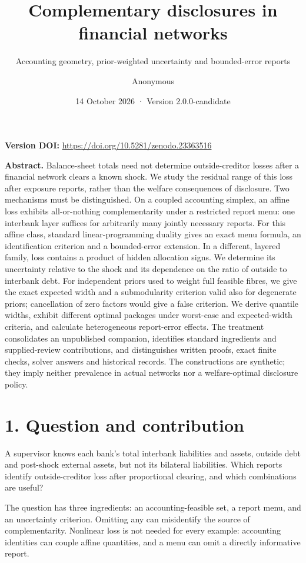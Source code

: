 \documentclass[
  british,
  11pt,
  a4paper,
]{article}
\title{Complementary disclosures in financial networks}
\subtitle{Accounting geometry, prior-weighted uncertainty and
bounded-error reports}
\author{Anonymous}
\date{14 October 2026 · Version 2.0.0-candidate}
\begin{document}
\maketitle

\textbf{Version DOI:} \url{https://doi.org/10.5281/zenodo.23363516}

\textbf{Abstract.} Balance-sheet totals need not determine
outside-creditor losses after a financial network clears a known shock.
We study the residual range of this loss after exposure reports, rather
than the welfare consequences of disclosure. Two mechanisms must be
distinguished. On a coupled accounting simplex, an affine loss exhibits
all-or-nothing complementarity under a restricted report menu: one
interbank layer suffices for arbitrarily many jointly necessary reports.
For this affine class, standard linear-programming duality gives an
exact menu formula, an identification criterion and a bounded-error
extension. In a different, layered family, loss contains a product of
hidden allocation signs. We determine its uncertainty relative to the
shock and its dependence on the ratio of outside to interbank debt. For
independent priors used to weight full feasible fibres, we give the
exact expected width and a submodularity criterion valid also for
degenerate priors; cancellation of zero factors would give a false
criterion. We derive quantile widths, exhibit different optimal packages
under worst-case and expected-width criteria, and calculate
heterogeneous report-error effects. The treatment consolidates an
unpublished companion, identifies standard ingredients and
supplied-review contributions, and distinguishes written proofs, exact
finite checks, solver answers and historical records. The constructions
are synthetic; they imply neither prevalence in actual networks nor a
welfare-optimal disclosure policy.

\section{1. Question and contribution}\label{question-and-contribution}

A supervisor knows each bank's total interbank liabilities and assets,
outside debt and post-shock external assets, but not its bilateral
liabilities. Which reports identify outside-creditor loss after
proportional clearing, and which combinations are useful?

The question has three ingredients: an accounting-feasible set, a report
menu, and an uncertainty criterion. Omitting any can misidentify the
source of complementarity. Nonlinear loss is not needed for every
example: accounting identities can couple affine quantities, and a menu
can omit a directly informative report.
\end{document}
